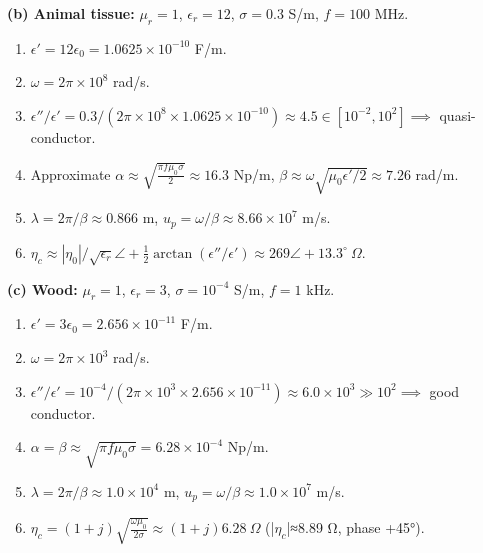 \begin{enumerate}
\textbf{(b) Animal tissue:} $\mu_r=1$, $\epsilon_r=12$, $\sigma=0.3$ S/m, $f=100$ MHz.
\begin{enumerate}[(1)]
  \item $\epsilon'=12\epsilon_0=1.0625\times10^{-10}$ F/m.
  \item $\omega=2\pi\times10^8$ rad/s.
  \item $\epsilon''/\epsilon'=0.3/(2\pi\times10^8\times1.0625\times10^{-10})\approx4.5\in[10^{-2},10^{2}]\implies$ quasi-conductor.
  \item Approximate $\alpha\approx\sqrt{\tfrac{\pi f\mu_0\sigma}{2}}\approx16.3$ Np/m, \quad $\beta\approx \omega\sqrt{\mu_0\epsilon'/2}\approx7.26$ rad/m.
  \item $\lambda=2\pi/\beta\approx0.866$ m, \quad $u_p=\omega/\beta\approx8.66\times10^7$ m/s.
  \item $\eta_c\approx|\eta_0|/\sqrt{\epsilon_r}\angle+\tfrac12\arctan(\epsilon''/\epsilon')\approx269\angle+13.3^\circ\ \Omega$.
\end{enumerate}

\textbf{(c) Wood:} $\mu_r=1$, $\epsilon_r=3$, $\sigma=10^{-4}$ S/m, $f=1$ kHz.
\begin{enumerate}[(1)]
  \item $\epsilon'=3\epsilon_0=2.656\times10^{-11}$ F/m.
  \item $\omega=2\pi\times10^3$ rad/s.
  \item $\epsilon''/\epsilon'=10^{-4}/(2\pi\times10^3\times2.656\times10^{-11})\approx6.0\times10^3\gg10^2\implies$ good conductor.
  \item $\alpha=\beta\approx\sqrt{\pi f\mu_0\sigma}=6.28\times10^{-4}$ Np/m.
  \item $\lambda=2\pi/\beta\approx1.0\times10^4$ m, \quad $u_p=\omega/\beta\approx1.0\times10^7$ m/s.
  \item $\eta_c=(1+j)\sqrt{\frac{\omega\mu_0}{2\sigma}}\approx(1+j)6.28\ \Omega$ (|$\eta_c$|≈8.89 Ω, phase +45°).
\end{enumerate}


\end{enumerate}
